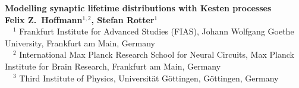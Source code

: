 \documentclass[a0,portrait]{a0poster}
\begin{document}


\begin{minipage}[b]{0.75\linewidth}
\vspace{-0.5cm}   
  \veryHuge \textbf{Modelling synaptic lifetime distributions with Kesten processes} \color{Black}\\[1.5cm] 
  \huge \textbf{Felix Z.~Hoffmann$^{1,2}$, Stefan Rotter$^1$}\\[0.5cm] %
\large $\quad ^1$ Frankfurt Institute for Advanced Studies (FIAS), Johann Wolfgang Goethe University, Frankfurt am Main, Germany\\[0.2cm] %
$\quad ^2$ International Max Planck Research School for Neural Circuits, Max Planck Institute for Brain Research, Frankfurt am Main, Germany\\[0.2cm]
$\quad ^3$ Third Institute of Physics, Universität Göttingen, Göttingen, Germany
\\[0.4cm]
\end{minipage}
%
\end{document}
